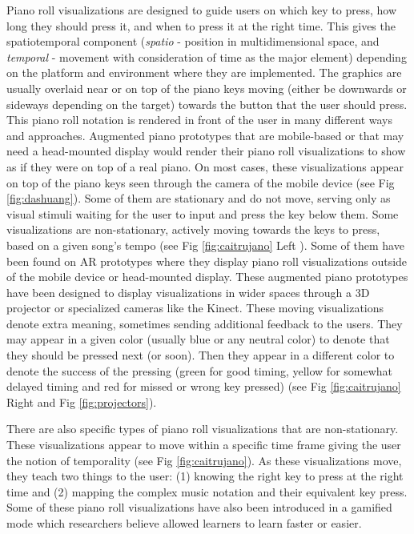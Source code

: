 \documentclass[sigconf, screen, review]{acmart}
\begin{document}
Piano roll visualizations are designed to guide users on which key to press, how long they should press it, and when to press it at the right time. This gives the spatiotemporal component (\textit{spatio} - position in multidimensional space, and \textit{temporal} - movement with consideration of time as the major element) depending on the platform and environment where they are implemented. The graphics are usually overlaid near or on top of the piano keys moving (either be downwards or sideways depending on the target) towards the button that the user should press. This piano roll notation is rendered in front of the user in many different ways and approaches.  Augmented piano prototypes that are mobile-based or that may need a head-mounted display would render their piano roll visualizations to show as if they were on top of a real piano. On most cases, these visualizations appear on top of the piano keys seen through the camera of the mobile device (see Fig \ref{fig:dashuang}). Some of them are stationary and do not move, serving only as visual stimuli waiting for the user to input and press the key below them. Some visualizations are non-stationary, actively moving towards the keys to press, based on a given song's tempo (see Fig \ref{fig:caitrujano} Left ). Some of them have been found on AR prototypes where they display piano roll visualizations outside of the mobile device or head-mounted display. These augmented piano prototypes have been designed to display visualizations in wider spaces through a 3D projector or specialized cameras like the Kinect. These moving visualizations denote extra meaning, sometimes sending additional feedback to the users. They may appear in a given color (usually blue or any neutral color) to denote that they should be pressed next (or soon). Then they appear in a different color to denote the success of the pressing (green for good timing, yellow for somewhat delayed timing and red for missed or wrong key pressed) (see Fig \ref{fig:caitrujano} Right and Fig \ref{fig:projectors}). 

There are also specific types of piano roll visualizations that are non-stationary. These visualizations appear to move within a specific time frame giving the user the notion of temporality (see Fig \ref{fig:caitrujano}). As these visualizations move, they teach two things to the user: (1) knowing the right key to press at the right time and (2) mapping the complex music notation and their equivalent key press. Some of these piano roll visualizations have also been introduced in a gamified mode \cite{Weing:2013:PEI:2494091.2494113} which researchers believe allowed learners to learn faster or easier. 
\end{document}
